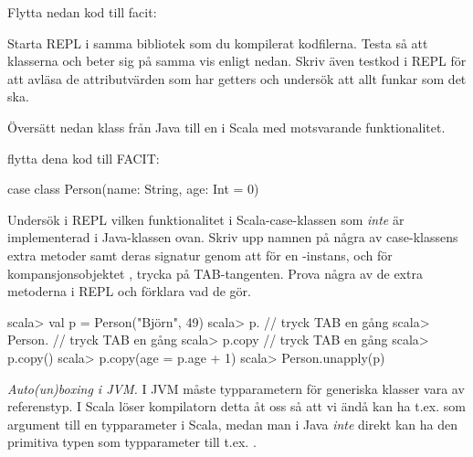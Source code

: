 \TODO Flytta nedan kod till facit:


\Subtask Starta REPL i samma bibliotek som du kompilerat kodfilerna. Testa så att klasserna  och  beter sig på samma vis enligt nedan. Skriv även testkod i REPL för att avläsa de attributvärden som har getters och undersök att allt funkar som det ska.


\Subtask Översätt nedan klass  från Java till en  i Scala med  motsvarande funktionalitet.  




\TODO flytta dena kod till FACIT:
\begin{Code}
case class Person(name: String, age: Int = 0)
\end{Code}

\Subtask\Pen Undersök i REPL vilken funktionalitet i Scala-case-klassen  som \emph{inte} är implementerad i Java-klassen  ovan. Skriv upp namnen på några av case-klassens extra metoder samt deras signatur genom att för en -instans, och för kompansjonsobjektet , trycka på TAB-tangenten. Prova några av de extra metoderna i REPL och förklara vad de gör.

\begin{REPL}
scala> val p = Person("Björn", 49)
scala> p.      // tryck TAB en gång
scala> Person. // tryck TAB en gång
scala> p.copy  // tryck TAB en gång
scala> p.copy()
scala> p.copy(age = p.age + 1)
scala> Person.unapply(p)
\end{REPL}


\Task \emph{Auto(un)boxing i JVM.} I JVM måste typparametern för generiska klasser vara av referenstyp. I Scala löser kompilatorn detta åt oss så att vi ändå kan ha t.ex.  som argument till en typparameter i Scala, medan man i Java \emph{inte} direkt kan ha den primitiva typen  som typparameter till t.ex. .

